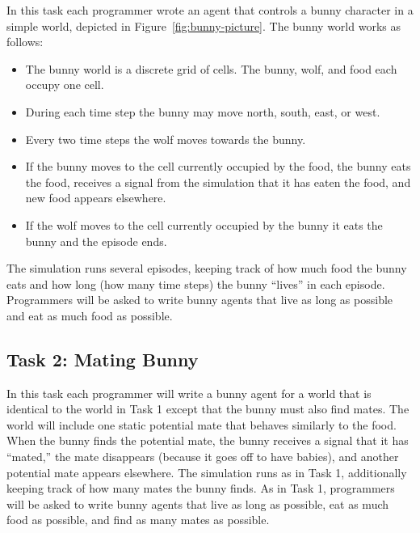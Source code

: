 In this task each programmer wrote an agent that controls a bunny character in a simple
world, depicted in Figure~\ref{fig:bunny-picture}.  The bunny world works as follows:

\begin{itemize}

\item The bunny world is a discrete grid of cells.  The bunny, wolf, and food each occupy one cell.

\item During each time step the bunny may move north, south, east, or west.

\item Every two time steps the wolf moves towards the bunny.

\item If the bunny moves to the cell currently occupied by the food, the bunny eats the food, receives a signal from the simulation that it has eaten the food, and new food appears elsewhere.

\item If the wolf moves to the cell currently occupied by the bunny it eats the bunny and the episode ends.

\end{itemize}

The simulation runs several episodes, keeping track of how much food the bunny eats and how long (how many time steps) the bunny ``lives'' in each episode.  Programmers will be asked to write bunny agents that live as long as possible and eat as much food as possible.

\subsection{Task 2: Mating Bunny}\label{sec:task2}

In this task each programmer will write a bunny agent for a world that is identical to the world in Task 1 except that the bunny must also find mates.  The world will include one static  potential mate that behaves similarly to the food.  When the bunny finds the potential mate, the bunny receives a signal that it has ``mated,'' the mate disappears (because it goes off to have babies), and another potential mate appears elsewhere.  The simulation runs as in Task 1, additionally keeping track of how many mates the bunny finds.  As in Task 1, programmers will be asked to write bunny agents that live as long as possible, eat as much food as possible, and find as many mates as possible.

